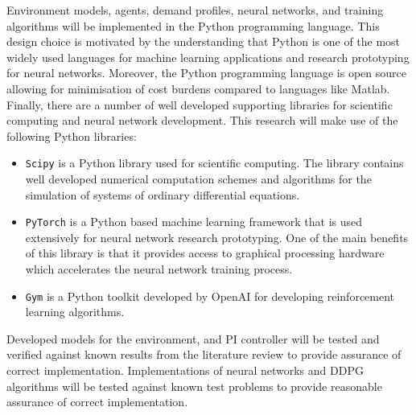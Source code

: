 Environment models, agents, demand profiles, neural networks, and training algorithms will be implemented in the Python programming language. This design choice is motivated by the understanding that Python is one of the most widely used languages for machine learning applications and research prototyping for neural networks. Moreover, the Python programming language is open source allowing for minimisation of cost burdens compared to languages like Matlab. Finally, there are a number of well developed supporting libraries for scientific computing and neural network development. This research will make use of the following Python libraries:
\begin{itemize}
	\item \texttt{Scipy} is a Python library used for scientific computing. The library contains well developed numerical computation schemes and algorithms for the simulation of systems of ordinary differential equations.
	\item \texttt{PyTorch} is a Python based machine learning framework that is used extensively for neural network research prototyping. One of the main benefits of this library is that it provides access to graphical processing hardware which accelerates the neural network training process.
	\item \texttt{Gym} is a Python toolkit developed by OpenAI for developing reinforcement learning algorithms.
\end{itemize}

Developed models for the environment, and PI controller will be tested and verified against known results from the literature review to provide assurance of correct implementation. Implementations of neural networks and DDPG algorithms will be tested against known test problems to provide reasonable assurance of correct implementation.